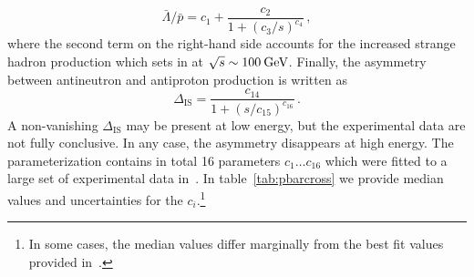 \documentclass[a4paper,11pt]{article}
\newcommand{\eVdist}{\kern-0.06em}
\newcommand{\gev}{\:\text{Ge\eVdist V}}
\newcommand{\iso}{\ensuremath{\Delta_{\text{IS}}}}
\begin{document}
\begin{equation}\label{eq:lambdapara}
\bar{\Lambda}/\bar{p}= c_1 +  \frac{c_2}{1+(c_3/s)^{c_4}}\,,
\end{equation}
where the second term on the right-hand side accounts for the increased strange hadron production which sets in at $\sqrt{s}\sim 100\gev$. Finally, the asymmetry between antineutron and antiproton production is written as
\begin{equation}\label{eq:isofit}
\iso =  \frac{c_{14}}{1+(s/c_{15})^{c_{16}}}\,.
\end{equation}
A non-vanishing $\iso$ may be present at low energy, but the experimental data are not fully conclusive. In any case, the asymmetry disappears at high energy. The parameterization contains in total 16 parameters $c_{1}\dots c_{16}$ which were fitted to a large set of experimental data in~\cite{Winkler:2017xor}. In table~\ref{tab:pbarcross} we provide median values and uncertainties for the $c_i$.\footnote{In some cases, the median values differ marginally from the best fit values provided in~\cite{Winkler:2017xor}.}
\end{document}
